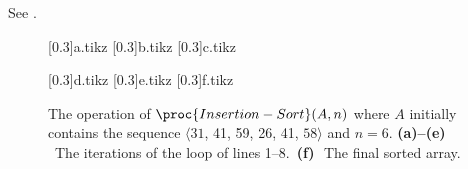 See .
\begin{figure}[htb]
    \hfill\subcaptionbox{\label{fig:2.1-1a}}[0.3\textwidth]{{a.tikz}}
    \hfill\subcaptionbox{\label{fig:2.1-1b}}[0.3\textwidth]{{b.tikz}}
    \hfill\subcaptionbox{\label{fig:2.1-1c}}[0.3\textwidth]{{c.tikz}}
    \par\medskip
    \hfill\subcaptionbox{\label{fig:2.1-1d}}[0.3\textwidth]{{d.tikz}}
    \hfill\subcaptionbox{\label{fig:2.1-1e}}[0.3\textwidth]{{e.tikz}}
    \hfill\subcaptionbox{\label{fig:2.1-1f}}[0.3\textwidth]{{f.tikz}}
    \caption{The operation of $\proc{Insertion-Sort}(A,n)$ where $A$ initially contains the sequence $\langle31$, 41, 59, 26, 41, $58\rangle$ and $n=6$.
    \textbf{(a)--(e)}\,~The iterations of the  loop of lines 1--8.\,
    \textbf{(f)}\,~The final sorted array.} \label{fig:2.1-1}
\end{figure}
